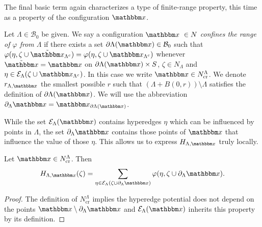 The final basic term again characterizes a type of finite-range property, this time as a property of the configuration $\x$.

\begin{definition}\label{def:cr}
	Let $\Lambda \in \mathcal B_0$ be given. We say a configuration $\x\ \in N$ \textit{confines the range of $\varphi$ from $\Lambda$} if there exists a set $\partial \Lambda(\x) \in \mathcal B_0$ such that $\varphi(\eta,\zeta \cup \tilde{\x}_{\Lambda^c}) = \varphi(\eta,\zeta\cup\x_{\Lambda^c})$ whenever $\tilde{\x} = \x$ on $\partial \Lambda(\x)\times S$, $\zeta \in N_\Lambda$ and $\eta \in \mathcal E_\Lambda(\zeta\cup\x_{\Lambda^c})$. In this case we write $\x \in N^\Lambda_\text{cr}$. We denote $r_{\Lambda,\x}$ the smallest possible $r$ such that $(\Lambda + B(0,r))\setminus \Lambda$ satisfies the definition of $\partial \Lambda(\x)$. We will use the abbreviation $\partial_\Lambda \x = \x_{\partial \Lambda(\x)}$.
\end{definition}

While the set $\mathcal E_\Lambda(\x)$ contains hyperedges $\eta$ which can be influenced by points in $\Lambda$, the set $\partial_\Lambda \x$  contains those points of $\x$ that influence the value of those $\eta$. This allows us to express $H_{\Lambda,\x}$ truly locally.

\begin{proposition}\label{prop:Hcr}Let $\x\in N^\Lambda_\text{cr}$. Then 
	$$H_{\Lambda,\x}(\zeta) = \sum_{\eta \in \mathcal E_\Lambda(\zeta \cup \partial_\Lambda \x)} \varphi(\eta, \zeta \cup \partial_\Lambda \x).$$
\end{proposition}
\begin{proof} The definition of $N^\Lambda_\text{cr}$ implies the hyperedge potential does not depend on the points $\x \setminus \partial_\Lambda \x$ and $\mathcal E_\Lambda(\x)$ inherits this property by its definition.
\end{proof}




